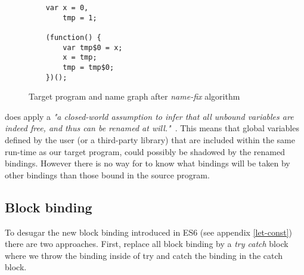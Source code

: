 \begin{figure}[h]
\centering
\begin{minipage}{0.25\linewidth}
\begin{lstlisting}
	var x = 0,
		tmp = 1;

	(function() {
		var tmp$0 = x;
		x = tmp;
		tmp = tmp$0;
	})();
\end{lstlisting}
\end{minipage}
\hfill
\begin{minipage}{0.65\linewidth}
\end{minipage}

\caption{Target program and name graph after \textit{name-fix} algorithm} \label{fig:name-graph-fixed}
\end{figure}

\textit{\vfix} does apply a \textit{"a closed-world assumption to infer that all unbound variables are indeed free, and thus can be renamed at will."}~\cite{Erdweg2014}. This means that global variables defined by the user (or a third-party library) that are included within the same run-time as our target program, could possibly be shadowed by the renamed bindings. However there is no way for \textit{\vfix} to know what bindings will be taken by other bindings than those bound in the source program.

\subsection{Block binding}
To desugar the new block binding introduced in ES6 (see appendix \ref{let-const}) there are two approaches. First, replace all block binding by a \textit{try catch} block where we throw the binding inside of try and catch the binding in the catch block.

